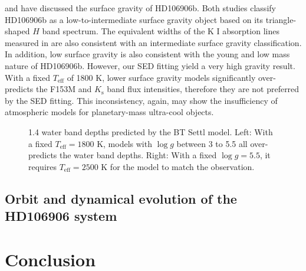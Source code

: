 \documentclass[twocolumn]{aastex62}
\begin{document}
\citet{Bailey2013} and \citet{Daemgen2017} have discussed the surface gravity of HD106906b. Both studies classify HD106906b as a low-to-intermediate surface gravity object based on its triangle-shaped $H$ band spectrum. The equivalent widths of the K I absorption lines measured in \citet{Daemgen2017} are also consistent with an intermediate surface gravity classification. In addition, low surface gravity is also consistent with the young and low mass nature of HD106906b. However, our SED fitting yield a very high gravity result. With a fixed $T_{\mathrm{eff}}$ of 1800 K, lower surface gravity models significantly over-predicts the F153M and $K_{\mathrm{s}}$ band flux intensities, therefore they are not preferred by the SED fitting. This inconsistency, again, may show the insufficiency of atmospheric models for planetary-mass ultra-cool objects.

\begin{figure}
  \centering
  \caption{1.4 \micron{} water band depths predicted by the BT Settl model. Left: With a fixed $T_{\mathrm{eff}}=1800$ K, models with $\log g$ between 3 to 5.5 all over-predicts the water band depths. Right: With a fixed $\log g=5.5$, it requires $T_{\mathrm{eff}}=2500$ K for the model to match the observation.}
  \label{fig:waterdepth}
\end{figure}

\subsection{Orbit and dynamical evolution of the HD106906 system}


\section{Conclusion}
\end{document}

